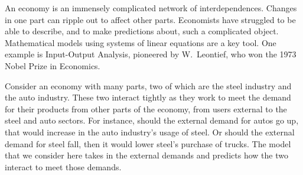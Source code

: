 An economy is an immensely complicated network of interdependences.
Changes in one part can ripple out to affect other parts.
Economists have struggled to be able to describe, and to make
predictions about, such a complicated object.
Mathematical models using systems of linear equations
are a key tool.
One example is Input-Output Analysis, pioneered by 
W.~Leontief, 
who won the 1973 Nobel Prize in Economics.

Consider an economy with many parts, two of which are the steel industry and
the auto industry.
These two interact tightly
as they work to meet the demand for their products
from other parts of the economy, from users external to the steel and
auto sectors.
For instance, should the external demand for autos go up, that would 
increase in the auto industry's usage of steel.
Or should the external demand for steel fall, then it would lower
steel's purchase of trucks.
The model that
we consider here takes in the external demands
and predicts how the two interact to meet those demands.


